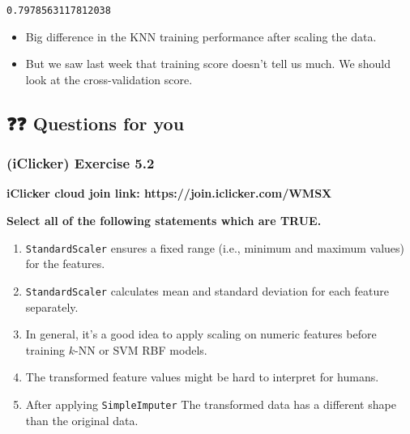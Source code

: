 \documentclass[11pt]{article}
\makeatletter
\providecommand{\tightlist}{%
      \setlength{\itemsep}{0pt}\setlength{\parskip}{0pt}}
\newcommand{\boxspacing}{\kern\kvtcb@left@rule\kern\kvtcb@boxsep}
\newcommand{\prompt}[4]{
        {\ttfamily\llap{{\color{#2}[#3]:\hspace{3pt}#4}}\vspace{-\baselineskip}}
    }
\makeatother
\begin{document}
            \begin{tcolorbox}[breakable, size=fbox, boxrule=.5pt, pad at break*=1mm, opacityfill=0]
\prompt{Out}{outcolor}{43}{\boxspacing}
\begin{Verbatim}[commandchars=\\\{\}]
0.7978563117812038
\end{Verbatim}
\end{tcolorbox}
        
    \begin{itemize}
\tightlist
\item
  Big difference in the KNN training performance after scaling the data.
\item
  But we saw last week that training score doesn't tell us much. We
  should look at the cross-validation score.
\end{itemize}

    

    \subsection{❓❓ Questions for you}\label{questions-for-you}

    \subsubsection{(iClicker) Exercise 5.2}\label{iclicker-exercise-5.2}

\textbf{iClicker cloud join link: https://join.iclicker.com/WMSX}

\textbf{Select all of the following statements which are TRUE.}

\begin{enumerate}
\def\labelenumi{\arabic{enumi}.}
\tightlist
\item
  \texttt{StandardScaler} ensures a fixed range (i.e., minimum and
  maximum values) for the features.
\item
  \texttt{StandardScaler} calculates mean and standard deviation for
  each feature separately.
\item
  In general, it's a good idea to apply scaling on numeric features
  before training \(k\)-NN or SVM RBF models.
\item
  The transformed feature values might be hard to interpret for humans.
\item
  After applying \texttt{SimpleImputer} The transformed data has a
  different shape than the original data.
\end{enumerate}
\end{document}
